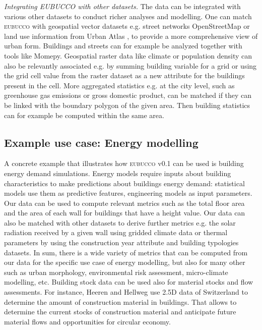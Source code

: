\documentclass[fleqn,10pt]{wlscirep}
\begin{document}
\medskip \noindent \textit{Integrating EUBUCCO with other datasets.} \hspace{0.1cm} 
The data can be integrated with various other datasets to conduct richer analyses and modelling. One can match \textsc{eubucco} with geospatial vector datasets e.g. street networks OpenStreetMap \cite{haklay2008openstreetmap} or land use information from Urban Atlas \cite{copernicus2018}, to provide a more comprehensive view of urban form. Buildings and streets can for example be analyzed together with tools like Momepy\cite{fleischmann2019momepy}. Geospatial raster data like climate \cite{de2015urbclim} or population density \cite{meta2017} can also be relevantly associated e.g. by summing building variable for a grid or using the grid cell value from the raster dataset as a new attribute for the buildings present in the cell. More aggregated statistics e.g. at the city level, such as greenhouse gas emissions or gross domestic product, can be matched if they can be linked with the boundary polygon of the given area. Then building statistics can for example be computed within the same area.   

\subsection*{Example use case: Energy modelling} 
A concrete example that illustrates how \textsc{eubucco} v0.1 can be used is building energy demand simulations. Energy models require inputs about building characteristics to make predictions about buildings energy demand: statistical models use them as predictive features, engineering models as input parameters. Our data can be used to compute relevant metrics such as the total floor area and the area of each wall for buildings that have a height value. Our data can also be matched with other datasets to derive further metrics e.g. the solar radiation received by a given wall using gridded climate data or thermal parameters by using the construction year attribute and building typologies datasets. In sum, there is a wide variety of metrics that can be computed from our data for the specific use case of energy modelling, but also for many other such as urban morphology, environmental risk assessment, micro-climate modelling, etc. 
Building stock data can be used also for material stocks and flow assessments. For instance, Heeren and Hellweg use 2.5D data of Switzerland to determine the amount of construction material in buildings. That allows to determine the current stocks of construction material and anticipate future material flows and opportunities for circular economy. \cite{heeren2019tracking}
\end{document}
